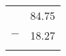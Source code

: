 \documentclass[border = 1mm]{standalone}
\begin{document}
\begin{tabular}{c r}
     &84.75 \tabularnewline
    $-$&18.27 \tabularnewline
    \hline
     & \tabularnewline
    \hline
\end{tabular}
\end{document}
